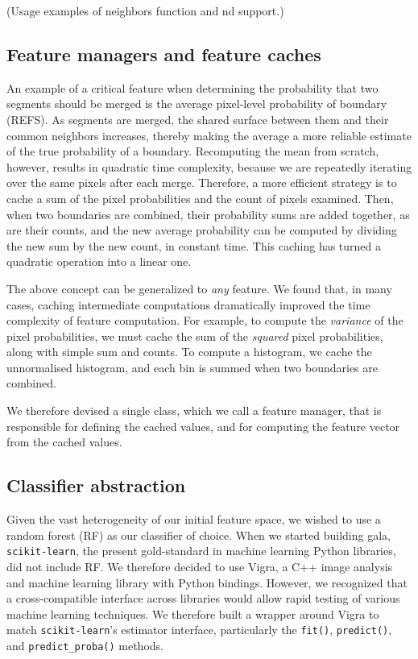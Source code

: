 \documentclass{frontiersSCNS} %
\begin{document}
(Usage examples of neighbors function and nd support.)


\subsection{Feature managers and feature caches}

An example of a critical feature when determining the probability that two segments should be merged is the average pixel-level probability of boundary (REFS).
As segments are merged, the shared surface between them and their common neighbors increases, thereby making the average a more reliable estimate of the true probability of a boundary.
Recomputing the mean from scratch, however, results in quadratic time complexity, because we are repeatedly iterating over the same pixels after each merge.
Therefore, a more efficient strategy is to cache a sum of the pixel probabilities and the count of pixels examined.
Then, when two boundaries are combined, their probability sums are added together, as are their counts, and the new average probability can be computed by dividing the new sum by the new count, in constant time.
This caching has turned a quadratic operation into a linear one.

The above concept can be generalized to \emph{any} feature.
We found that, in many cases, caching intermediate computations dramatically improved the time complexity of feature computation.
For example, to compute the \emph{variance} of the pixel probabilities, we must cache the sum of the \emph{squared} pixel probabilities, along with simple sum and counts.
To compute a histogram, we cache the unnormalised histogram, and each bin is summed when two boundaries are combined.

We therefore devised a single class, which we call a feature manager, that is responsible for defining the cached values, and for computing the feature vector from the cached values.


\subsection{Classifier abstraction}

Given the vast heterogeneity of our initial feature space, we wished to use a random forest (RF) as our classifier of choice.
When we started building gala, \texttt{scikit-learn}, the present gold-standard in machine learning Python libraries, did not include RF.
We therefore decided to use Vigra, a C++ image analysis and machine learning library with Python bindings.
However, we recognized that a cross-compatible interface across libraries would allow rapid testing of various machine learning techniques.
We therefore built a wrapper around Vigra to match \texttt{scikit-learn}'s estimator interface, particularly the \texttt{fit()}, \texttt{predict()}, and \texttt{predict\_proba()} methods.
\end{document}
